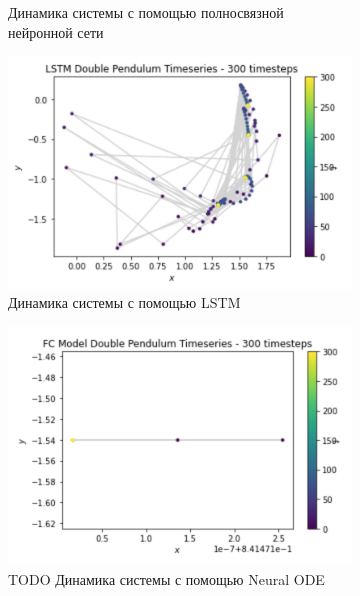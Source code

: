 \documentclass[12pt]{article}
\begin{document}
\begin{figure}[H]
\begin{subfigure}[b]{0.49\textwidth}
			\caption{Динамика системы с помощью полносвязной нейронной сети}
			\label{fig:three sin x}
		\end{subfigure}
				\hfill
				\vfill
		\begin{subfigure}[b]{0.49\textwidth}
			\centering
			\includegraphics[width=\textwidth]{lstm_pendulum.png}
			\caption{Динамика системы с помощью LSTM}
			\label{fig:three sin x}
		\end{subfigure}
			\hfill
		\begin{subfigure}[b]{0.49\textwidth}
			\centering
			\includegraphics[width=\textwidth]{fc_pendulum.png}
			\caption{TODO Динамика системы с помощью Neural ODE}
			\label{fig:five over x}
		\end{subfigure}
		\begin{subfigure}[b]{0.49\textwidth}
			\centering

\end{subfigure}
\end{figure}
\end{document}
